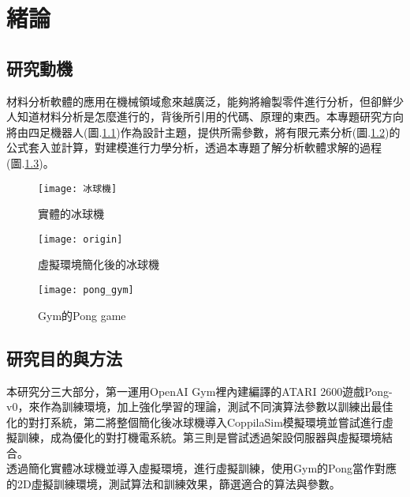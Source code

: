 \chapter{緒論}
\renewcommand{\baselinestretch}{10.0} %
\setcounter{page}{1}  %
\fontsize{14pt}{2.5pt}\sectionef
\section{研究動機}
材料分析軟體的應用在機械領域愈來越廣泛，能夠將繪製零件進行分析，但卻鮮少人知道材料分析是怎麼進行的，背後所引用的代碼、原理的東西。本專題研究方向將由四足機器人(圖.\ref{fig.冰球機})作為設計主題，提供所需參數，將有限元素分析(圖.\ref{fig.模擬冰球機})的公式套入並計算，對建模進行力學分析，透過本專題了解分析軟體求解的過程(圖.\ref{fig.pong_gym})。\\

\begin{figure}[hbt!]
\begin{center}
\texttt{[image: 冰球機]}
\caption{\Large 實體的冰球機}\label{fig.冰球機}
\end{center}
\end{figure}
\begin{figure}[hbt!]
\begin{center}
\texttt{[image: origin]}
\caption{\Large 虛擬環境簡化後的冰球機}\label{fig.模擬冰球機}
\end{center}
\end{figure}
\begin{figure}[hbt!]
\begin{center}
\texttt{[image: pong\_gym]}
\caption{\Large Gym的Pong game}\label{fig.pong_gym}
\end{center}
\end{figure}


\section{研究目的與方法}
本研究分三大部分，第一運用OpenAI Gym裡內建編譯的ATARI 2600遊戲Pong-v0，來作為訓練環境，加上強化學習的理論，測試不同演算法參數以訓練出最佳化的對打系統，第二將整個簡化後冰球機導入CoppilaSim模擬環境並嘗試進行虛擬訓練，成為優化的對打機電系統。第三則是嘗試透過架設伺服器與虛擬環境結合。\\
 
透過簡化實體冰球機並導入虛擬環境，進行虛擬訓練，使用Gym的Pong當作對應的2D虛擬訓練環境，測試算法和訓練效果，篩選適合的算法與參數。\\

